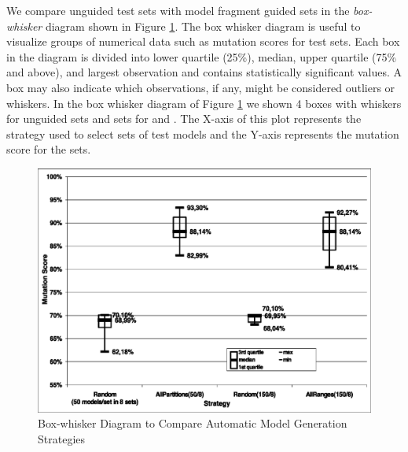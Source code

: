 We compare unguided test sets with model fragment guided sets in the \emph{box-whisker} diagram shown in Figure \ref{fig:whisker}. The box whisker diagram is useful to visualize groups of numerical data such as mutation scores for test sets. Each box in the diagram is divided into lower quartile (25\%), median, upper quartile (75\% and above), and largest observation and contains statistically significant values. A box may also indicate which observations, if any, might be considered outliers or whiskers. In the box whisker diagram of Figure \ref{fig:whisker} we shown 4 boxes with whiskers for unguided sets and sets for {\AllRanges} and {\AllPartitions}. The X-axis of this plot represents the strategy used to select sets of test models and the Y-axis represents the mutation score for the sets.

\begin{figure} 

\begin{center}
\includegraphics[width=5 in]{./figures/boxplot.eps}
\end{center}
\caption{Box-whisker Diagram to Compare Automatic Model Generation Strategies}
\label{fig:whisker}

\end{figure}


